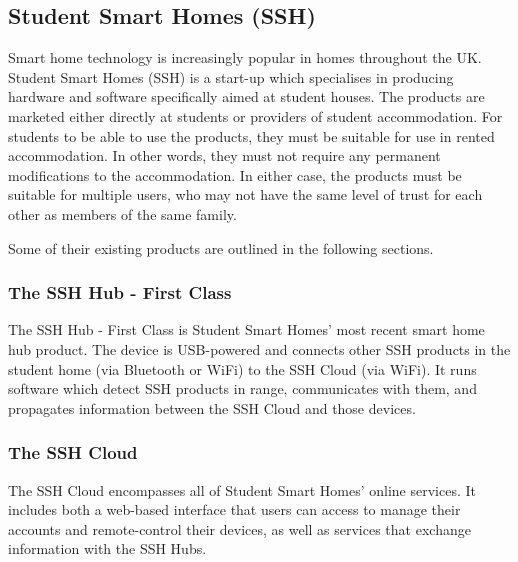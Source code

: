 
\subsection{Student Smart Homes (SSH)}

Smart home technology is increasingly popular in homes throughout the UK. Student Smart Homes (SSH) is a start-up which specialises in producing hardware and software specifically aimed at student houses. The products are marketed either directly at students or providers of student accommodation. For students to be able to use the products, they must be suitable for use in rented accommodation. In other words, they must not require any permanent modifications to the accommodation. In either case, the products must be suitable for multiple users, who may not have the same level of trust for each other as members of the same family.

Some of their existing products are outlined in the following sections.

\subsubsection{The SSH Hub - First Class}

The SSH Hub - First Class is Student Smart Homes' most recent smart home hub product. The device is USB-powered and connects other SSH products in the student home (via Bluetooth or WiFi) to the SSH Cloud (via WiFi). It runs software which detect SSH products in range, communicates with them, and propagates information between the SSH Cloud and those devices.

\subsubsection{The SSH Cloud}

The SSH Cloud encompasses all of Student Smart Homes' online services. It includes both a web-based interface that users can access to manage their accounts and remote-control their devices, as well as services that exchange information with the SSH Hubs.


